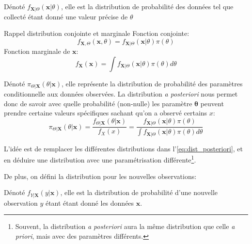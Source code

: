 \documentclass[10pt, french]{article}
\begin{document}
\begin{multicols*}{3}
\begin{definitionNOHFILL}
Dénoté $f_{\bm{X} | \Theta}(\bm{x} | \theta)$, elle est la distribution de probabilité des données tel que collecté étant donné une valeur précise de $\theta$ 
\end{definitionNOHFILL}

\begin{rappel}{Rappel distribution conjointe et marginale}
Fonction conjointe:
\begin{equation*}
	f_{\bm{X}, \Theta}(\bm{x}, \theta)
	=	f_{\bm{X}|\Theta}(\bm{x} | \theta) \pi(\theta)
\end{equation*}
Fonction marginale de $\bm{x}$:
\begin{equation*}
	f_{\bm{X}}(\bm{x})
	=	\int f_{\bm{X}|\Theta}(\bm{x} | \theta) \pi(\theta) d\theta
\end{equation*}
\end{rappel}

\begin{definitionNOHFILL}
Dénoté $\pi_{\Theta | \bm{X}}(\theta | \bm{x})$, elle représente la distribution de probabilité des paramètres conditionnelle aux données observées. 
La distribution \emph{a posteriori} nous permet donc de savoir avec quelle probabilité (non-nulle) les paramètre $\bm\theta$ peuvent prendre certaine valeurs spécifiques sachant qu'on a observé certains $x$: 
\begin{equation}
\label{eq:dist_posteriori}
	\pi_{\Theta | \bm{X}}(\theta | \bm{x})
	= 	\frac{f_{\Theta | \bm{X}}(\theta | \bm{x})}{f_{X}(x)} 
	= 	\frac{f_{\bm{X}|\Theta}(\bm{x} | \theta) \pi(\theta)}{\int f_{\bm{X}|\Theta}(\bm{x} | \theta) \pi(\theta) d\theta} 
\end{equation}

L'idée est de remplacer les différentes distributions dans l'\autoref{eq:dist_posteriori}, et en déduire une distribution avec une paramétrisation différente\footnote{Souvent, la distribution \emph{a posteriori} aura la même distribution que celle \emph{a priori}, mais avec des paramètres différents.}.
\end{definitionNOHFILL}

De plus, on défini la distribution pour les nouvelles observations:
\begin{definitionNOHFILL}
Dénoté $f_{Y | \bm{X}}(y | \bm{x})$, elle est la distribution de probabilité d'une nouvelle observation $y$ étant étant donné les données $\bm{x}$.


\end{definitionNOHFILL}
\end{multicols*}
\end{document}
